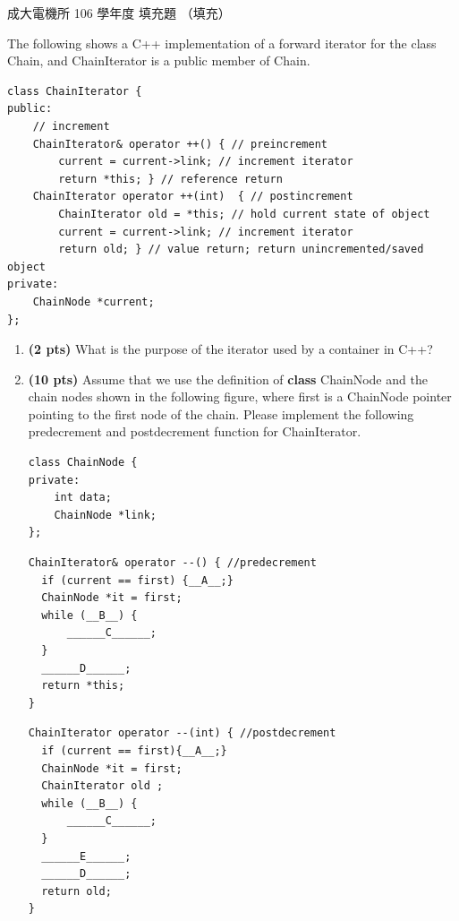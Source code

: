\begin{pastexam}[label={px:ncku-106-ee-ds-08}]{成大電機所 106 學年度 填充題}
（填充）

The following shows a C++ implementation of a forward iterator for the class Chain, and ChainIterator is a
public member of Chain.
\begin{verbatim}
class ChainIterator {
public:
    // increment
    ChainIterator& operator ++() { // preincrement
        current = current->link; // increment iterator
        return *this; } // reference return
    ChainIterator operator ++(int)  { // postincrement
        ChainIterator old = *this; // hold current state of object
        current = current->link; // increment iterator
        return old; } // value return; return unincremented/saved object
private:
    ChainNode *current;
};
\end{verbatim}

\begin{enumerate}[leftmargin=2.5em]
\item[(一)] \textbf{(2 pts)} What is the purpose of the iterator used by a container in C++?
\item[(二)] \textbf{(10 pts)} Assume that we use the definition of \textbf{class} ChainNode and the chain nodes
shown in the following figure, where first is a ChainNode pointer pointing to the first node of the chain.
Please implement the following predecrement and postdecrement function for ChainIterator.
\begin{verbatim}
class ChainNode {
private:
    int data;
    ChainNode *link;
};
\end{verbatim}

\begin{center}
\end{center}

\begin{verbatim}
ChainIterator& operator --() { //predecrement
  if (current == first) {__A__;}
  ChainNode *it = first;
  while (__B__) {
      ______C______;
  }
  ______D______;
  return *this;
}
\end{verbatim}
\smallskip
\begin{verbatim}
ChainIterator operator --(int) { //postdecrement
  if (current == first){__A__;}
  ChainNode *it = first;
  ChainIterator old ;
  while (__B__) {
      ______C______;
  }
  ______E______;
  ______D______;
  return old;
}
\end{verbatim}


\end{enumerate}
\end{pastexam}

